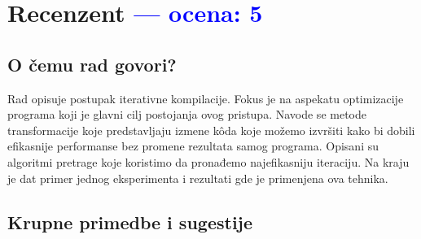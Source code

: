 \documentclass[a4paper]{report}
\newcommand{\odgovor}[1]{\textcolor{blue}{#1}}
\begin{document}
\chapter{Recenzent \odgovor{--- ocena: 5 } }


\section{O čemu rad govori?}
Rad opisuje postupak iterativne kompilacije. Fokus je na aspekatu optimizacije programa koji je glavni cilj postojanja ovog pristupa. Navode se metode transformacije koje predstavljaju izmene kôda koje možemo izvršiti kako bi dobili efikasnije performanse bez promene rezultata samog programa. Opisani su algoritmi pretrage koje koristimo da pronađemo najefikasniju iteraciju. Na kraju je dat primer jednog eksperimenta i rezultati gde je primenjena ova tehnika.

\section{Krupne primedbe i sugestije}
\end{document}
